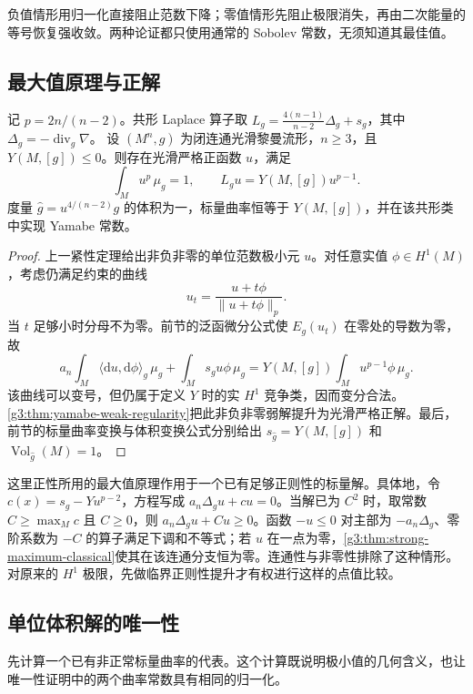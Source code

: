 负值情形用归一化直接阻止范数下降；零值情形先阻止极限消失，再由二次能量的等号恢复强收敛。两种论证都只使用通常的 Sobolev 常数，无须知道其最佳值。

\subsection{最大值原理与正解}
\label{g3:subsec:2403:03}
\begin{theorem}\label{g3:thm:yamabe-nonpositive-existence}
	记 \(p=2n/(n-2)\)。共形 Laplace 算子取 \(L_g=\tfrac{4(n-1)}{n-2}\Delta_g+s_g\)，其中 \(\Delta_g=-\operatorname{div}_g\nabla\)。
	设 \((M^n,g)\) 为闭连通光滑黎曼流形，\(n\ge3\)，且 \(Y(M,[g])\le0\)。则存在光滑严格正函数 \(u\)，满足
	\[
		\int_Mu^p\,\mu_g=1,
		\qquad L_gu=Y(M,[g])u^{p-1}.
	\]
	度量 \(\widehat g=u^{4/(n-2)}g\) 的体积为一，标量曲率恒等于 \(Y(M,[g])\)，并在该共形类中实现 Yamabe 常数。
\end{theorem}
\begin{proof}
	上一紧性定理给出非负非零的单位范数极小元 \(u\)。对任意实值 \(\phi\in H^1(M)\)，考虑仍满足约束的曲线
	\[
		u_t=\frac{u+t\phi}{\|u+t\phi\|_p}.
	\]
	当 \(t\) 足够小时分母不为零。前节的泛函微分公式使 \(E_g(u_t)\) 在零处的导数为零，故
	\[
		a_n\int_M\langle\mathrm du,\mathrm d\phi\rangle_g\,\mu_g
		+\int_Ms_gu\phi\,\mu_g
		=Y(M,[g])\int_Mu^{p-1}\phi\,\mu_g.
	\]
	该曲线可以变号，但仍属于定义 \(Y\) 时的实 \(H^1\) 竞争类，因而变分合法。\cref{g3:thm:yamabe-weak-regularity}把此非负非零弱解提升为光滑严格正解。最后，前节的标量曲率变换与体积变换公式分别给出 \(s_{\widehat g}=Y(M,[g])\) 和 \(\operatorname{Vol}_{\widehat g}(M)=1\)。
\end{proof}

这里正性所用的最大值原理作用于一个已有足够正则性的标量解。具体地，令 \(c(x)=s_g-Yu^{p-2}\)，方程写成 \(a_n\Delta_gu+cu=0\)。当解已为 \(C^2\) 时，取常数 \(C\ge\max_M c\) 且 \(C\ge0\)，则 \(a_n\Delta_gu+Cu\ge0\)。函数 \(-u\le0\) 对主部为 \(-a_n\Delta_g\)、零阶系数为 \(-C\) 的算子满足下调和不等式；若 \(u\) 在一点为零，\cref{g3:thm:strong-maximum-classical}使其在该连通分支恒为零。连通性与非零性排除了这种情形。对原来的 \(H^1\) 极限，先做临界正则性提升才有权进行这样的点值比较。

\subsection{单位体积解的唯一性}
\label{g3:subsec:2403:04}
先计算一个已有非正常标量曲率的代表。这个计算既说明极小值的几何含义，也让唯一性证明中的两个曲率常数具有相同的归一化。

